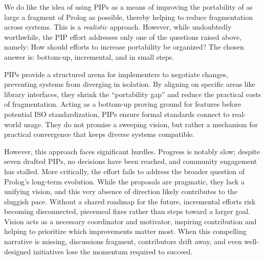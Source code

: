 We do like the idea of using PIPs as a means of improving the portability of as large a fragment of Prolog as possible, thereby helping to reduce fragmentation across systems. This is a \textit{realistic} approach. However, while undoubtedly worthwhile, the PIP effort addresses only one of the questions raised above, namely: How should efforts to increase portability be organized? The chosen answer is: bottom-up, incremental, and in small steps.

PIPs provide a structured arena for implementers to negotiate changes, preventing systems from diverging in isolation. By aligning on specific areas like library interfaces, they shrink the ``portability gap'' and reduce the practical costs of fragmentation. Acting as a bottom-up proving ground for features before potential ISO standardization, PIPs ensure formal standards connect to real-world usage. They do not promise a sweeping vision, but rather a mechanism for practical convergence that keeps diverse systems compatible.

However, this approach faces significant hurdles. Progress is notably slow; despite seven drafted PIPs, no decisions have been reached, and community engagement has stalled. More critically, the effort fails to address the broader question of Prolog's long-term evolution. While the proposals are pragmatic, they lack a unifying vision, and this very absence of direction likely contributes to the sluggish pace. Without a shared roadmap for the future, incremental efforts risk becoming disconnected, piecemeal fixes rather than steps toward a larger goal. Vision acts as a necessary coordinator and motivator, inspiring contribution and helping to prioritize which improvements matter most. When this compelling narrative is missing, discussions fragment, contributors drift away, and even well-designed initiatives lose the momentum required to succeed.

